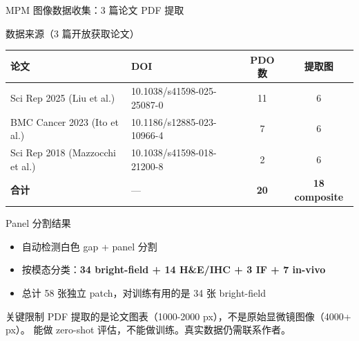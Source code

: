 \documentclass[aspectratio=169, 10pt]{beamer}
\begin{document}
\begin{frame}{MPM 图像数据收集：3 篇论文 PDF 提取}
  \begin{block}{数据来源（3 篇开放获取论文）}
    \begin{tabular}{llcc}
      \toprule
      \textbf{论文} & \textbf{DOI} & \textbf{PDO 数} & \textbf{提取图} \\
      \midrule
      Sci Rep 2025 (Liu et al.) & 10.1038/s41598-025-25087-0 & 11 & 6 \\
      BMC Cancer 2023 (Ito et al.) & 10.1186/s12885-023-10966-4 & 7 & 6 \\
      Sci Rep 2018 (Mazzocchi et al.) & 10.1038/s41598-018-21200-8 & 2 & 6 \\
      \midrule
      \textbf{合计} & — & \textbf{20} & \textbf{18 composite} \\
      \bottomrule
    \end{tabular}
  \end{block}
  \vspace{-0.3em}
  \begin{block}{Panel 分割结果}
    \begin{itemize}
      \item 自动检测白色 gap + panel 分割
      \item 按模态分类：\textbf{34 bright-field + 14 H\&E/IHC + 3 IF + 7 in-vivo}
      \item 总计 58 张独立 patch，对训练有用的是 34 张 bright-field
    \end{itemize}
  \end{block}
  \vspace{-0.3em}
  \begin{alertblock}{关键限制}
    PDF 提取的是论文图表（1000-2000 px），不是原始显微镜图像（4000+ px）。
    能做 zero-shot 评估，不能做训练。真实数据仍需联系作者。
  \end{alertblock}
\end{frame}
\end{document}
